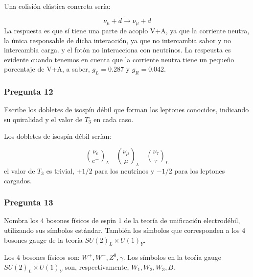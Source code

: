 Una colisión elástica concreta sería:

\begin{equation}
	\nu_\mu + d \rightarrow  \nu_\mu + d
\end{equation}
La respuesta es que sí tiene una parte de acoplo V+A, ya que la corriente neutra, la única responsable de dicha interacción, ya que no intercambia sabor y no intercambia carga. y el fotón no interacciona con neutrinos. La respeusta es evidente cuando tenemos en cuenta que la corriente neutra tiene un pequeño porcentaje  de V+A, a saber, $g_L=0.287$ y $g_R=0.042$.

\vspace*{2em}

\begin{Enunciado}
	\subsubsection*{Pregunta 12}

	Escribe los dobletes de isospín débil que forman los leptones conocidos, indicando su quiralidad y el valor de $T_3$ en cada caso.

\end{Enunciado}

Los dobletes de isospín débil serían:

\begin{equation}
	\binom{\nu_e}{e^-}_L \quad \binom{\nu_\mu}{\mu}_L \quad \binom{\nu_\tau}{\tau}_L
\end{equation}
el valor de $T_3$ es trivial, $+1/2$ para los neutrinos y $-1/2$ para los leptones cargados.

\vspace*{2em}

\begin{Enunciado}
	\subsubsection*{Pregunta 13}

	Nombra los 4 bosones físicos de espín 1 de la teoría de unificación electrodébil, utilizando sus símbolos estándar. También los símbolos que corresponden a los 4 bosones gauge de la teoría $SU(2)_L \times U(1)_Y$.

\end{Enunciado}


Los 4 bosones físicos son: $W^+,W^-,Z^0,\gamma$. Los símbolos en la teoŕia gauge $SU(2)_L \times U(1)_Y$ son, respectivamente, $W_1,W_2,W_3,B$.


